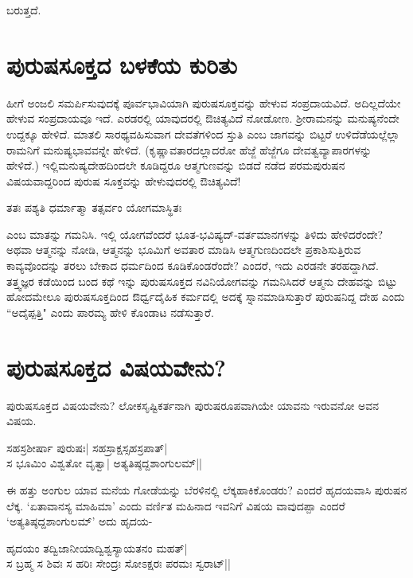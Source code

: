 ಬರುತ್ತದೆ.

\section*{ಪುರುಷಸೂಕ್ತದ ಬಳಕೆಯ ಕುರಿತು}

ಹೀಗೆ ಅಂಜಲಿ ಸಮರ್ಪಿಸುವುದಕ್ಕೆ ಪೂರ್ವಭಾವಿಯಾಗಿ ಪುರುಷಸೂಕ್ತವನ್ನು ಹೇಳುವ ಸಂಪ್ರದಾಯವಿದೆ. ಅದಿಲ್ಲದೆಯೇ ಹೇಳುವ ಸಂಪ್ರದಾಯವೂ ಇದೆ. ಎರಡರಲ್ಲಿ ಯಾವುದರಲ್ಲಿ ಔಚಿತ್ಯವಿದೆ ನೋಡೋಣ. ಶ್ರೀರಾಮನನ್ನು ಮನುಷ್ಯನೆಂದೇ ಉದ್ದಕ್ಕೂ ಹೇಳಿದೆ. ಮಾತಲಿ ಸಾರಥ್ಯವಹಿಸುವಾಗ ದೇವತೆಗಳಿಂದ ಸ್ತುತಿ ಎಂಬ ಜಾಗವನ್ನು ಬಿಟ್ಟರೆ ಉಳಿದೆಡೆಯಲ್ಲೆಲ್ಲಾ ರಾಮನಿಗೆ ಮನುಷ್ಯಭಾವವನ್ನೇ ಹೇಳಿದೆ. (ಕೃಷ್ಣಾವತಾರದಲ್ಲಾದರೋ ಹೆಜ್ಜೆ ಹೆಜ್ಜೆಗೂ ದೇವತ್ವವ್ಯಾಪಾರಗಳನ್ನು ಹೇಳಿದೆ.) ಇಲ್ಲಿಮನುಷ್ಯದೇಹದಿಂದಲೇ ಕೂಡಿದ್ದರೂ ಆತ್ಮಗುಣವನ್ನು ಬಿಡದೆ ನಡೆದ ಪರಮಪುರುಷನ ವಿಷಯವಾದ್ದರಿಂದ ಪುರುಷ ಸೂಕ್ತವನ್ನು ಹೇಳುವುದರಲ್ಲಿ ಔಚಿತ್ಯವಿದೆ!

\begin{shloka}
ತತಃ ಪಶ್ಯತಿ ಧರ್ಮಾತ್ಮಾ ತತ್ಸರ್ವಂ ಯೋಗಮಾಸ್ಥಿತಃ\label{248}
\end{shloka}

ಎಂಬ ಮಾತನ್ನು ಗಮನಿಸಿ. ಇಲ್ಲಿ ಯೋಗವೆಂದರೆ ಭೂತ-ಭವಿಷ್ಯದ್-ವರ್ತಮಾನಗಳನ್ನು ತಿಳಿದು ಹೇಳಿದರೆಂದೇ? ಅಥವಾ ಆತ್ಮನನ್ನು ನೋಡಿ, ಆತ್ಮನನ್ನು ಭೂಮಿಗೆ ಅವತಾರ ಮಾಡಿಸಿ ಆತ್ಮಗುಣದಿಂದಲೇ ಪ್ರಕಾಶಿಸುತ್ತಿರುವ ಕಾವ್ಯವೊಂದನ್ನು ತರಲು ಬೇಕಾದ ಧರ್ಮದಿಂದ ಕೂಡಿಕೊಂಡರೆಂದೇ? ಎಂದರೆ, ಇದು ಎರಡನೇ ತರಹದ್ದಾಗಿದೆ. ತತ್ತ್ವಜ್ಞರ ಕಡೆಯಿಂದ ಬಂದ ಕಥೆ ಇನ್ನು ಪುರುಷಸೂಕ್ತದ ನವಿನಿಯೋಗವನ್ನು ಗಮನಿಸಿದರೆ ಆತ್ಮನು ದೇಹವನ್ನು ಬಿಟ್ಟು ಹೋದಮೇಲೂ ಪುರುಷಸೂಕ್ತದಿಂದ ಔರ್ಧ್ವದೈಹಿಕ ಕರ್ಮದಲ್ಲಿ ಅದಕ್ಕೆ ಸ್ನಾನಮಾಡಿಸುತ್ತಾರೆ ಪುರುಷನಿದ್ದ ದೇಹ ಎಂದು ``ಅದೈಪ್ಪತ್ತಿ" ಎಂದು ಪಾರಮ್ಯ ಹೇಳಿ ಕೊಂಡಾಟ ನಡೆಸುತ್ತಾರೆ. 

\section*{ಪುರುಷಸೂಕ್ತದ ವಿಷಯವೇನು?}

ಪುರುಷಸೂಕ್ತದ ವಿಷಯವೇನು? ಲೋಕಸೃಷ್ಟಿಕರ್ತನಾಗಿ ಪುರುಷರೂಪವಾಗಿಯೇ ಯಾವನು ಇರುವನೋ ಅವನ ವಿಷಯ. 

\begin{shloka}
ಸಹಸ್ರಶೀರ್ಷಾ ಪುರುಷಃ| ಸಹಸ್ರಾಕ್ಷಸ್ಸಹಸ್ರಪಾತ್|\\
ಸ ಭೂಮಿಂ ವಿಶ್ವತೋ ವೃತ್ವಾ| ಅತ್ಯತಿಷ್ಠದ್ದಶಾಂಗುಲಮ್||
\end{shloka}

ಈ ಹತ್ತು ಅಂಗುಲ ಯಾವ ಮನೆಯ ಗೋಡೆಯನ್ನು ಬೆರಳಿನಲ್ಲಿ ಲೆಕ್ಕಹಾಕಿಕೊಂಡರು? ಎಂದರೆ ಹೃದಯವಾಸಿ ಪುರುಷನ ಲೆಕ್ಕ. `ಏತಾವಾನಸ್ಯ ಮಾಹಿಮಾ'\label{249} ಎಂದು ವರ್ಣಿತ ಮಹಿನಾದ ಇವನಿಗೆ ವಿಷಯ ವಾವುದಪ್ಪಾ ಎಂದರೆ `ಅತ್ಯತಿಷ್ಠದ್ದಶಾಂಗುಲಮ್' ಅದು ಹೃದಯ-

\begin{shloka}
ಹೃದಯಂ ತದ್ವಿಜಾನೀಯಾದ್ವಿಶ್ವಸ್ಯಾಯತನಂ ಮಹತ್|\\
ಸ ಬ್ರಹ್ಮ ಸ ಶಿವಃ ಸ ಹರಿಃ ಸೇಂದ್ರಃ ಸೋಽಕ್ಷರಃ ಪರಮಃ ಸ್ವರಾಟ್||
\end{shloka}

